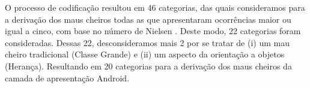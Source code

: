 O processo de codificação resultou em 46 categorias, das quais consideramos para a derivação dos maus cheiros todas as que apresentaram ocorrências maior ou igual a cinco, com base no número de Nielsen \cite{NielsenMagicNumber:00}. Deste modo, 22 categorias foram consideradas. Dessas 22, desconsideramos mais 2 por se tratar de (i) um mau cheiro tradicional (Classe Grande) e (ii) um aspecto da orientação a objetos (Herança). Resultando em 20 categorias para a derivação dos maus cheiros da camada de apresentação Android.




